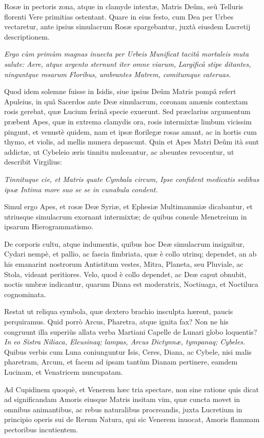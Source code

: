\documentclass[a4paper, 11pt, oneside, polutonikogreek, latin]{article}
\begin{document}
Rosæ in pectoris zona, atque in clamyde intextæ, Matris Deûm, seù Telluris florenti Vere primitias ostentant. Quare in eius festo, cum Dea per Urbes vectaretur, ante ipsius simulacrum Rosæ spargebantur, juxtà eiusdem Lucretij descriptionem.

\emph{Ergo cùm primùm magnas inuecta per Urbeis}
\emph{Munificat tacitå mortaleis muta salute:}
\emph{Aere, atque argento sternunt iter omne viarum,}
\emph{Largificå stipe ditantes, ninguntque rosarum}
\emph{Floribus, umbrantes Matrem, comitumque cateruas.}

Quod idem solemne fuisse in Isidis, siue ipsius Deûm Matris pompâ refert Apuleius, in quâ Sacerdos ante Deæ simulacrum, coronam amænis contextam rosis gerebat, quæ Lucium ferinâ specie exuerunt. Sed præclarius argumentum præbent Apes, quæ in extrema clamydis ora, rosis intermixtæ limbum vicissim pingunt, et venustè quidem, nam et ipsæ florilegæ rosas amant, ac in hortis cum thymo, et violis, ad mellis munera depascunt. Quin et Apes Matri Deûm ità sunt addictæ, ut Cybeleio æris tinnitu mulceantur, ac abeuntes revocentur, ut describit Virgilius:

\emph{Tinnituque cie, et Matris quate Cymbala circum,}
\emph{Ipse confident medicatis sedibus ipsæ}
\emph{Intima more suo se se in cunabula condent.}

Simul ergo Apes, et rosæ Deæ Syriæ, et Ephesiæ Multimammiæ dicabantur, et utriusque simulacrum exornant intermixtæ; de quibus consule Menetreium in ipsarum Hierogrammatismo.

De corporis cultu, atque indumentis, quibus hoc Deæ simulacrum insignitur, Cydari nempè, et pallio, ac fascia fimbriata, quæ è collo utrinq; dependet, an ab his emanarint nostrorum Antistitum vestes, Mitra, Planeta, seu Pluviale, ac Stola, videant peritiores. Velo, quod è collo dependet, ac Deæ caput obnubit, noctis umbræ indicantur, quarum Diana est moderatrix, Noctiuaga, et Noctiluca cognominata.

Restat ut reliqua symbola, quæ dextero brachio insculpta hærent, paucis perquiramus. Quid porrò Arcus, Pharetra, atque ignita fax? Non ne his congruunt illa superiùs allata verba Martiani Capelle de Lunari globo loquentis? \emph{In eo Sistra Niliaca, Eleusinaq; lampas, Arcus Dictynnæ, tympanaq; Cybeles.} Quibus verbis cum Luna coniunguntur Isis, Ceres, Diana, ac Cybele, nisi malis pharetram, Arcum, et facem ad ipsam tantùm Dianam pertinere, eamdem Lucinam, et Venatricem nuncupatam.

Ad Cupidinem quoquè, et Venerem hæc tria spectare, non sine ratione quis dicat ad significandam Amoris eiusque Matris insitam vim, quæ cuncta movet in omnibus animantibus, ac rebus naturalibus procreandis, juxta Lucretium in principio operis sui de Rerum Natura, qui sic Venerem inuocat, Amoris flammam pectoribus incutientem.
\end{document}
